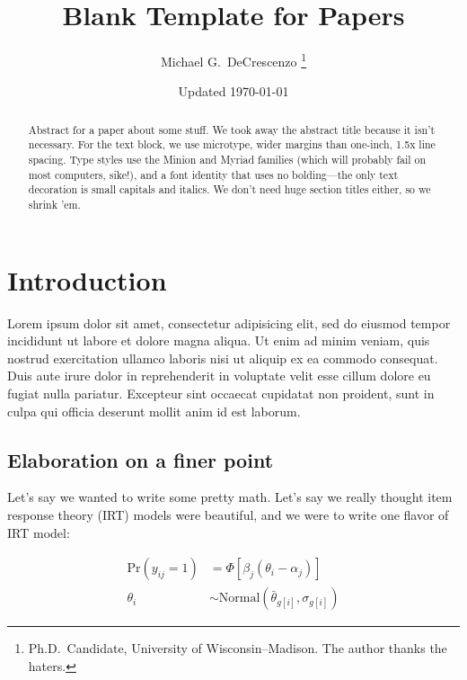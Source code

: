 \documentclass[12pt
              ]{article}
\begin{document}
\title{Blank Template for Papers}
\author{Michael G.\ DeCrescenzo%
          \thanks{Ph.D.\ Candidate, University of Wisconsin--Madison. The author thanks the haters.}}
\date{Updated \today}
\maketitle


\begin{abstract}
  Abstract for a paper about some stuff. We took away the abstract title because it isn't necessary. For the text block, we use microtype, wider margins than one-inch, 1.5x line spacing. Type styles use the Minion and Myriad families (which will probably fail on most computers, sike!), and a font identity that uses no bolding---the only text decoration is small capitals and italics. We don't need huge section titles either, so we shrink 'em.
\end{abstract}

\vspace{12pt}


\onehalfspacing


\section*{Introduction}

Lorem ipsum dolor sit amet, consectetur adipisicing elit, sed do eiusmod
tempor incididunt ut labore et dolore magna aliqua. Ut enim ad minim veniam,
quis nostrud exercitation ullamco laboris nisi ut aliquip ex ea commodo
consequat. Duis aute irure dolor in reprehenderit in voluptate velit esse
cillum dolore eu fugiat nulla pariatur. Excepteur sint occaecat cupidatat non
proident, sunt in culpa qui officia deserunt mollit anim id est laborum.


\subsection*{Elaboration on a finer point}

Let's say we wanted to write some pretty math. Let's say we really thought item response theory (IRT) models were beautiful, and we were to write one flavor of IRT model:

\begin{align}
  \mathrm{Pr}\left( y_{ij} = 1 \right)
  &=
  \Phi \left[
    \beta_{j} \left( \theta_{i} - \alpha_{j} \right)
  \right] \\
  \theta_{i} &\sim \mathrm{Normal}\left(\bar{\theta}_{g[i]}, \sigma_{g[i]} \right)
\end{align}



\newpage
\printbibliography
\end{document}
